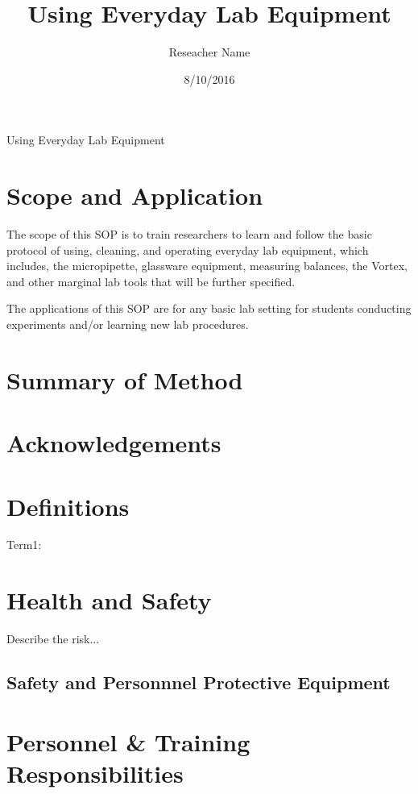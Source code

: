 \documentclass[12pt]{../SOP3_alpha}
\title{Using Everyday Lab Equipment }
\date{8/10/2016}
\author{Reseacher Name}
\begin{document}


\maketitle 
Using Everyday Lab Equipment 

\section{Scope and Application}

\NP The scope of this SOP is  to train researchers to learn and follow the basic protocol of using, cleaning, and operating everyday lab equipment, which includes, the micropipette, glassware equipment, measuring balances, the Vortex, and other marginal lab tools that will be further specified. 

\NP The applications of this SOP are for any basic lab setting for students conducting experiments and/or learning new lab procedures.

\section{Summary of Method}

\NP 

\tableofcontents

\newpage

\section{Acknowledgements}

\section{Definitions}

\NP Term1:


\section{Health and Safety}

\NP Describe the risk...


\subsection*{Safety and Personnnel Protective Equipment}


\section{Personnel \& Training Responsibilities}
\end{document}
